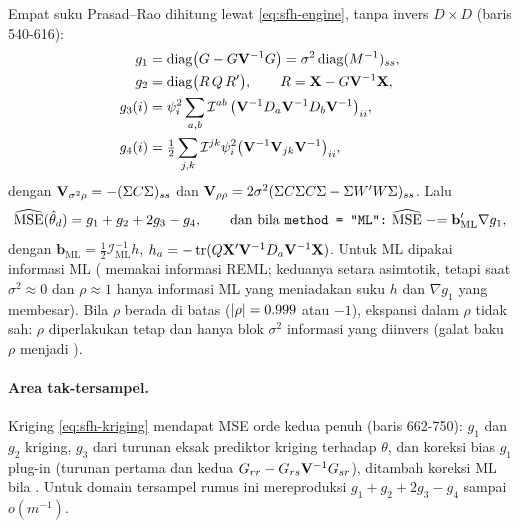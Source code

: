 Empat suku Prasad--Rao dihitung lewat \eqref{eq:sfh-engine}, tanpa invers
$D\times D$ (baris 540-616):
\begin{align}
  g_1 &= \operatorname{diag}\bigl(G-G\mathbf{V}^{-1}G\bigr)=\sigma^2\operatorname{diag}(M^{-1})_{ss},
    \label{eq:sfh-g1}\\
  g_2 &= \operatorname{diag}\bigl(R\,Q\,R'\bigr),\qquad R=\mathbf{X}-G\mathbf{V}^{-1}\mathbf{X},
    \label{eq:sfh-g2}\\
  g_3(i) &= \psi_i^2\sum_{a,b}\mathcal I^{ab}\,
    \bigl(\mathbf{V}^{-1}D_a\mathbf{V}^{-1}D_b\mathbf{V}^{-1}\bigr)_{ii},
    \label{eq:sfh-g3}\\
  g_4(i) &= \tfrac12\sum_{j,k}\mathcal I^{jk}\psi_i^2
    \bigl(\mathbf{V}^{-1}\mathbf{V}_{jk}\mathbf{V}^{-1}\bigr)_{ii},
    \label{eq:sfh-g4}
\end{align}
dengan $\mathbf{V}_{\sigma^2\rho}=-(\Sigma C\Sigma)_{ss}$ dan
$\mathbf{V}_{\rho\rho}=2\sigma^2(\Sigma C\Sigma C\Sigma-\Sigma W'W\Sigma)_{ss}$. Lalu
\begin{equation}
  \widehat{\mathrm{MSE}}(\hat\theta_d)=g_1+g_2+2g_3-g_4,
  \qquad
  \text{dan bila \texttt{method = "ML":}\ }
  \widehat{\mathrm{MSE}}\mathrel{-}=\mathbf{b}_{\text{ML}}'\nabla g_1,
  \label{eq:sfh-mse}
\end{equation}
dengan $\mathbf b_{\text{ML}}=\tfrac12\mathcal I_{\text{ML}}^{-1}h$,
$h_a=-\operatorname{tr}(Q\mathbf{X}'\mathbf{V}^{-1}D_a\mathbf{V}^{-1}\mathbf{X})$. Untuk ML dipakai informasi ML
( memakai informasi REML; keduanya setara asimtotik, tetapi saat
$\sigma^2\approx0$ dan $\rho\approx1$ hanya informasi ML yang meniadakan suku
$h$ dan $\nabla g_1$ yang membesar). Bila $\rho$ berada di batas
($\left|\rho\right|=0.999$ atau $-1$), ekspansi dalam $\rho$ tidak sah: $\rho$
diperlakukan tetap dan hanya blok $\sigma^2$ informasi yang diinvers (galat
baku $\rho$ menjadi ).

\paragraph{Area tak-tersampel.} Kriging \eqref{eq:sfh-kriging} mendapat MSE
orde kedua penuh (baris 662-750): $g_1$ dan $g_2$ kriging, $g_3$ dari turunan
eksak prediktor kriging terhadap $\theta$, dan koreksi bias $g_1$ plug-in
(turunan pertama dan kedua $G_{rr}-G_{rs}\mathbf{V}^{-1}G_{sr}$), ditambah koreksi ML
bila . Untuk domain tersampel rumus ini mereproduksi
$g_1+g_2+2g_3-g_4$ sampai $o(m^{-1})$.


